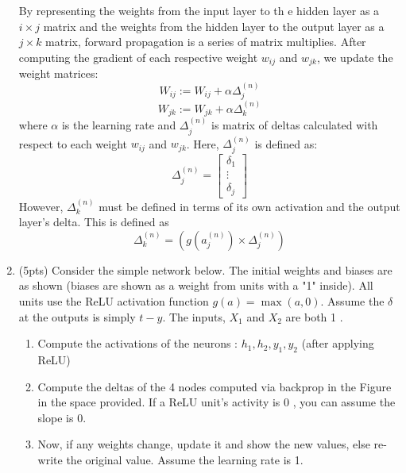 \begin{enumerate}[label=(\alph*)]
	      \begin{tcolorbox}[title={Solution}]
		      By representing the weights from the input layer to th e hidden
		      layer as a $i \times j$ matrix and the weights from the hidden
		      layer to the output layer as a $j \times k$ matrix, forward
		      propagation is a series of matrix multiplies. After computing the
		      gradient of each respective weight $w_{ij}$ and $w_{jk}$, we
		      update the weight matrices:
          $$ W_{ij} := W_{ij} + \alpha \Delta_j^{(n)}$$
          $$ W_{jk} := W_{jk} + \alpha \Delta_k^{(n)}$$
		      where $\alpha$ is the learning rate and $\Delta_j^{(n)} $ is matrix of
		      deltas calculated with respect to each weight $w_{ij}$ and
		      $w_{jk}$. Here, $\Delta_j^{(n)}$ is defined as:
		      $$
			      \Delta_j^{(n)} =
			      \begin{bmatrix}
				      \delta_1 \\
				      \vdots   \\
				      \delta_j
			      \end{bmatrix}
		      $$
          However, $\Delta_k^{(n)}$ must be defined in terms of its own activation and the output layer's delta.  This is defined as
          $$
          \Delta_k^{(n)} = \left( g \left( a_j^{(n)} \right) \times \Delta_j^{(n)} \right)
          $$
	      \end{tcolorbox}

	\item (5pts)  Consider the simple network below. The initial weights and biases are as shown (biases are shown as a weight from units with a "1" inside). All units use the ReLU activation function $g(a)=\max (a, 0)$. Assume the $\delta$ at the outputs is simply $t-y$. The inputs, $X_1$ and $X_2$ are both 1 .
	      \begin{enumerate}
		      \item Compute the activations of the neurons : $h_1, h_2, y_1, y_2$ (after applying ReLU)
		      \item Compute the  deltas of the 4 nodes computed via backprop in the Figure in the space provided. If a ReLU unit's activity is 0 , you can assume the slope is 0.
		      \item Now, if any weights change, update it and show the new values, else re-write the original value. Assume the learning rate is 1.

	      \end{enumerate}


\end{enumerate}
